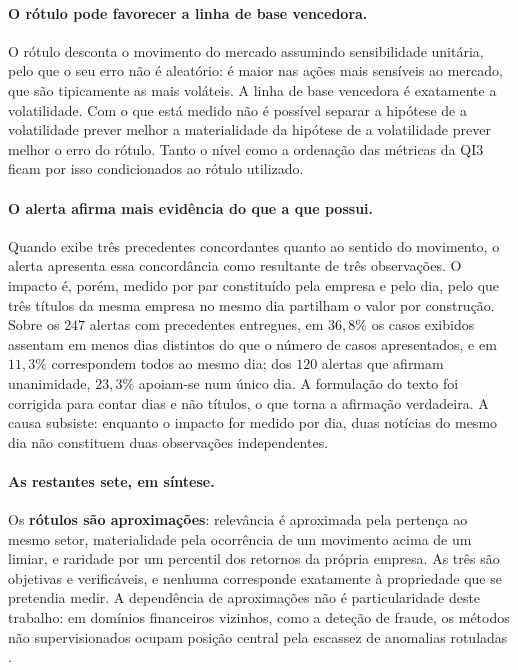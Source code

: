 \paragraph{O rótulo pode favorecer a linha de base vencedora.}
O rótulo desconta o movimento do mercado assumindo sensibilidade unitária, pelo que o seu erro não é
aleatório: é maior nas ações mais sensíveis ao mercado, que são tipicamente as mais voláteis. A
linha de base vencedora é exatamente a volatilidade. Com o que está medido não é possível separar a
hipótese de a volatilidade prever melhor a materialidade da hipótese de a volatilidade prever melhor
o erro do rótulo. Tanto o nível como a ordenação das métricas da \gls{QI}3 ficam por isso
condicionados ao rótulo utilizado.

\paragraph{O alerta afirma mais evidência do que a que possui.}
Quando exibe três precedentes concordantes quanto ao sentido do movimento, o alerta apresenta essa
concordância como resultante de três observações. O impacto é, porém, medido por par constituído
pela empresa e pelo dia, pelo que três títulos da mesma empresa no mesmo dia partilham o valor por
construção. Sobre os $247$ alertas com precedentes entregues, em $36{,}8\%$ os casos exibidos
assentam em menos dias distintos do que o número de casos apresentados, e em $11{,}3\%$
correspondem todos ao mesmo
dia; dos $120$ alertas que afirmam unanimidade, $23{,}3\%$ apoiam-se num único dia. A formulação do
texto foi corrigida para contar dias e não títulos, o que torna a afirmação verdadeira. A causa
subsiste: enquanto o impacto for medido por dia, duas notícias do mesmo dia não constituem duas
observações independentes.

\paragraph{As restantes sete, em síntese.}
Os \textbf{rótulos são aproximações}: relevância é aproximada pela pertença ao mesmo setor,
materialidade pela ocorrência de um movimento acima de um limiar, e raridade por um percentil dos
retornos da própria empresa. As três são objetivas e verificáveis, e nenhuma corresponde exatamente
à propriedade que se pretendia medir. A dependência de aproximações não é particularidade deste
trabalho: em domínios financeiros vizinhos, como a deteção de fraude, os métodos não supervisionados
ocupam posição central pela escassez de anomalias rotuladas \autocite{ahmed2016financial}.

